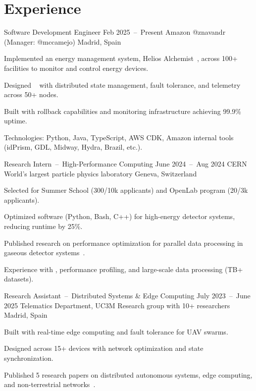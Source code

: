 \documentclass[a4paper]{article}
\begin{document}
\section{Experience}

\begin{cvitemizeentry}%
  {Software Development Engineer}
  {Feb 2025~--~Present}
  {Amazon}
  {@znavandr (Manager: @mccamejo)}
  {Madrid, Spain}
  \item Implemented an energy management system, Helios Alchemist~, across 100+ facilities to monitor and control energy devices.
  \item Designed ~ with distributed state management, fault tolerance, and telemetry across 50+ nodes.
  \item Built  with rollback capabilities and monitoring infrastructure achieving 99.9\% uptime.
  \item Technologies: Python, Java, TypeScript, AWS CDK, Amazon internal tools (idPrism, GDL, Midway, Hydra, Brazil, etc.).
\end{cvitemizeentry}

\begin{cvitemizeentry}%
  {Research Intern~--~High-Performance Computing}
  {June 2024~--~Aug 2024}
  {CERN}
  {World's largest particle physics laboratory}
  {Geneva, Switzerland}
  \item Selected for Summer School (300/10k applicants) and OpenLab program (20/3k applicants).
  \item Optimized  software (Python, Bash, C++) for high-energy detector systems, reducing runtime by 25\%.
  \item Published research on performance optimization for parallel data processing in gaseous detector systems~.
  \item Experience with , performance profiling, and large-scale data processing (TB+ datasets).
\end{cvitemizeentry}


\begin{cvitemizeentry}%
  {Research Assistant~--~Distributed Systems \& Edge Computing}
  {July 2023~--~June 2025}
  {Telematics Department, UC3M}
  {Research group with 10+ researchers}
  {Madrid, Spain}
  \item Built  with real-time edge computing and fault tolerance for UAV swarms.
  \item Designed  across 15+ devices with network optimization and state synchronization.
  \item Published 5 research papers on distributed autonomous systems, edge computing, and non-terrestrial networks~.
\end{cvitemizeentry}
\end{document}
